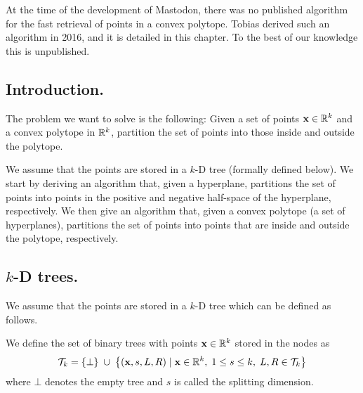 At the time of the development of Mastodon, there was no published algorithm for the fast retrieval of points in a convex polytope. 
Tobias derived such an algorithm in 2016, and it is detailed in this chapter. 
To the best of our knowledge this is unpublished.



\subsection{Introduction.}
The problem we want to solve is the following:
Given a set of points $\mathbf{x}\in\mathbb{R}^k$ and a convex polytope in $\mathbb{R}^k$, partition the set of points into those inside and outside the polytope.

We assume that the points are stored in a $k$-D tree (formally defined below).
We start by deriving an algorithm that, given a hyperplane, partitions the set of points into points in the positive and negative half-space of the hyperplane, respectively.
We then give an algorithm that, given a convex polytope (a set of hyperplanes), partitions the set of points into points that are inside and outside the polytope, respectively.


\subsection{$k$-D trees.}
We assume that the points are stored in a $k$-D tree which can be defined as follows.

\begin{definition}
\label{def:pointtree}
We define the set of binary trees with points $\mathbf{x}\in\mathbb{R}^k$ stored in the nodes as
	\begin{displaymath}
		\mathcal{T}_k =
			\left\{\bot\right\} \;\cup\;
			\left\{ (\mathbf{x}, s, L, R) \;|\; \mathbf{x} \in \mathbb{R}^k,\; 1 \leq s \leq k,\; L, R \in\mathcal{T}_k \right\}
	\end{displaymath}
where $\bot$ denotes the empty tree and $s$ is called the splitting dimension.
\end{definition}

